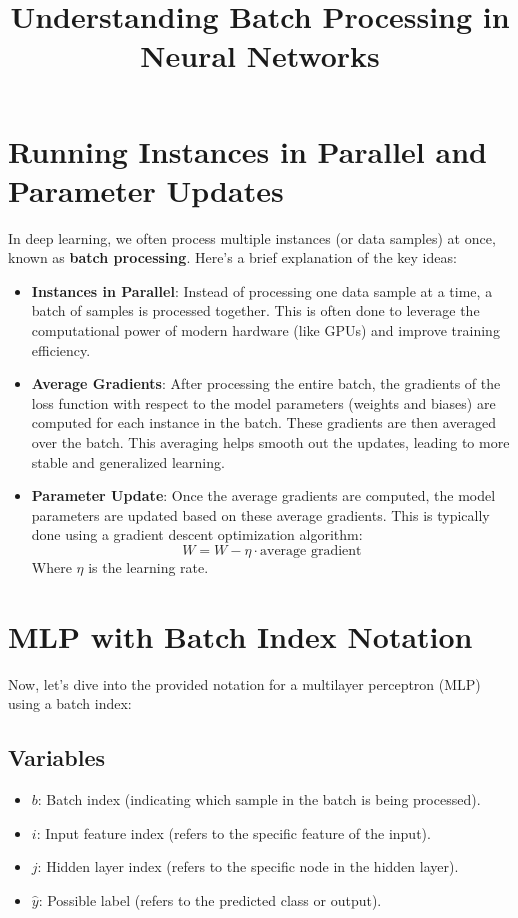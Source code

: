 \documentclass{article}
\begin{document}
\title{Understanding Batch Processing in Neural Networks}

\maketitle

\section{Running Instances in Parallel and Parameter Updates}

In deep learning, we often process multiple instances (or data samples) at once, known as \textbf{batch processing}. Here’s a brief explanation of the key ideas:

\begin{itemize}
    \item \textbf{Instances in Parallel}: Instead of processing one data sample at a time, a batch of samples is processed together. This is often done to leverage the computational power of modern hardware (like GPUs) and improve training efficiency.
    
    \item \textbf{Average Gradients}: After processing the entire batch, the gradients of the loss function with respect to the model parameters (weights and biases) are computed for each instance in the batch. These gradients are then averaged over the batch. This averaging helps smooth out the updates, leading to more stable and generalized learning.
    
    \item \textbf{Parameter Update}: Once the average gradients are computed, the model parameters are updated based on these average gradients. This is typically done using a gradient descent optimization algorithm:
    \begin{equation}
    W = W - \eta \cdot \text{average gradient}
    \end{equation}
    Where \( \eta \) is the learning rate.
\end{itemize}

\section{MLP with Batch Index Notation}

Now, let’s dive into the provided notation for a multilayer perceptron (MLP) using a batch index:

\subsection{Variables}
\begin{itemize}
    \item \( b \): Batch index (indicating which sample in the batch is being processed).
    \item \( i \): Input feature index (refers to the specific feature of the input).
    \item \( j \): Hidden layer index (refers to the specific node in the hidden layer).
    \item \( \hat{y} \): Possible label (refers to the predicted class or output).
\end{itemize}
\end{document}

